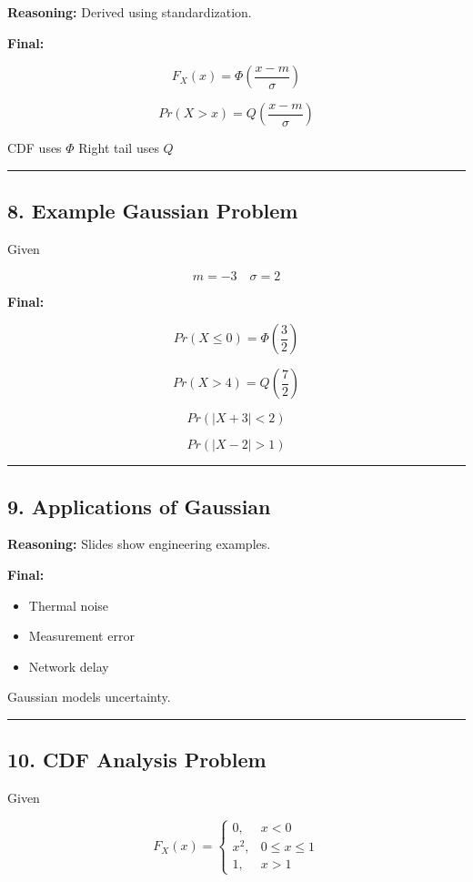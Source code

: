 \documentclass[12pt]{article}
\begin{document}
\textbf{Reasoning:}  
Derived using standardization.

\textbf{Final:}

\[
F_X(x) =
\Phi \left(
\frac{x-m}{\sigma}
\right)
\]

\[
Pr(X > x) =
Q \left(
\frac{x-m}{\sigma}
\right)
\]

CDF uses $\Phi$  
Right tail uses $Q$

\hrule

\subsection*{8. Example Gaussian Problem}

Given

\[
m = -3
\quad
\sigma = 2
\]

\textbf{Final:}

\[
Pr(X \le 0) =
\Phi \left(
\frac{3}{2}
\right)
\]

\[
Pr(X > 4) =
Q \left(
\frac{7}{2}
\right)
\]

\[
Pr(|X+3| < 2)
\]

\[
Pr(|X-2| > 1)
\]

\hrule

\subsection*{9. Applications of Gaussian}

\textbf{Reasoning:}  
Slides show engineering examples.

\textbf{Final:}

\begin{itemize}
\item Thermal noise
\item Measurement error
\item Network delay
\end{itemize}

Gaussian models uncertainty.

\hrule

\subsection*{10. CDF Analysis Problem}

Given

\[
F_X(x) =
\begin{cases}
0, & x < 0 \\
x^2, & 0 \le x \le 1 \\
1, & x > 1
\end{cases}
\]
\end{document}
